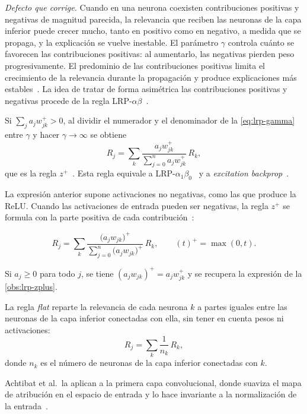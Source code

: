 \emph{Defecto que corrige.} Cuando en una neurona coexisten contribuciones
positivas y negativas de magnitud parecida, la relevancia que reciben las
neuronas de la capa inferior puede crecer mucho, tanto en positivo como en
negativo, a medida que se propaga, y la explicación se vuelve inestable. El
parámetro $\gamma$ controla cuánto se favorecen las contribuciones positivas: al
aumentarlo, las negativas pierden peso progresivamente. El predominio de las
contribuciones positivas limita el crecimiento de la relevancia durante la
propagación y produce explicaciones más estables~\cite{montavon2019lrp}. La idea
de tratar de forma asimétrica las contribuciones positivas y negativas procede
de la regla LRP-$\alpha\beta$~\cite{bach2015}.

\begin{observacion}\label{obs:lrp-zplus}
Si $\sum_{j} a_{j} w^{+}_{jk} > 0$, al dividir el numerador y el denominador de
la \cref{eq:lrp-gamma} entre $\gamma$ y hacer $\gamma \to \infty$ se obtiene
\[
  R_j = \sum_{k} \frac{a_j w^{+}_{jk}}{\sum_{j=0}^{n} a_{j} w^{+}_{jk}} \, R_k ,
\]
que es la regla $z^{+}$~\cite{montavon2017}. Esta regla equivale a
LRP-$\alpha_1\beta_0$~\cite{bach2015} y a \emph{excitation
backprop}~\cite{zhang2016excitation,montavon2019lrp}.
\end{observacion}

La expresión anterior supone activaciones no negativas, como las que produce la
ReLU. Cuando las activaciones de entrada pueden ser negativas, la regla $z^{+}$ se
formula con la parte positiva de cada contribución~\cite{achtibat2023}:

\begin{definicion}[Regla $z^{+}$]\label{def:lrp-zplus}
\begin{equation}\label{eq:lrp-zplus}
  R_j = \sum_{k} \frac{\bigl(a_j w_{jk}\bigr)^{+}}{\sum_{j=0}^{n} \bigl(a_j w_{jk}\bigr)^{+}} \, R_k ,
  \qquad (t)^{+} = \max(0, t).
\end{equation}
\end{definicion}
Si $a_j \ge 0$ para todo $j$, se tiene $(a_j w_{jk})^{+} = a_j w^{+}_{jk}$ y se
recupera la expresión de la \cref{obs:lrp-zplus}.

\begin{definicion}\label{def:lrp-flat}
La regla \emph{flat} reparte la relevancia de cada neurona $k$ a partes iguales
entre las neuronas de la capa inferior conectadas con ella, sin tener en cuenta
pesos ni activaciones:
\begin{equation}\label{eq:lrp-flat}
  R_j = \sum_{k} \frac{1}{n_k} \, R_k ,
\end{equation}
donde $n_k$ es el número de neuronas de la capa inferior conectadas con $k$.
\end{definicion}
Achtibat et al.\ la aplican a la primera capa convolucional, donde suaviza el mapa
de atribución en el espacio de entrada y lo hace invariante a la normalización de la
entrada~\cite{achtibat2023}.


